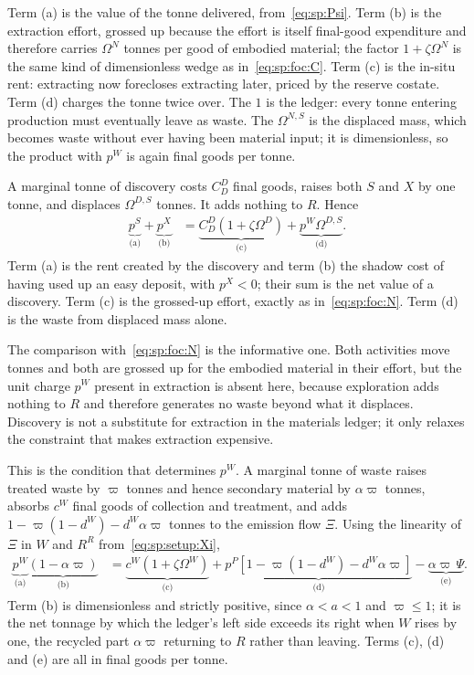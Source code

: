Term (a) is the value of the tonne delivered, from~\eqref{eq:sp:Psi}. Term (b) is the extraction effort, grossed up because the effort is itself final-good expenditure and therefore carries $\Omega^N$ tonnes per good of embodied material; the factor $1+\zeta\Omega^N$ is the same kind of dimensionless wedge as in~\eqref{eq:sp:foc:C}. Term (c) is the in-situ rent: extracting now forecloses extracting later, priced by the reserve costate. Term (d) charges the tonne twice over. The $1$ is the ledger: every tonne entering production must eventually leave as waste. The $\Omega^{N,S}$ is the displaced mass, which becomes waste without ever having been material input; it is dimensionless, so the product with $p^W$ is again final goods per tonne.

 A marginal tonne of discovery costs $C^D_D$ final goods, raises both $S$ and $X$ by one tonne, and displaces $\Omega^{D,S}$ tonnes. It adds nothing to $R$. Hence
\begin{align}
\underbrace{p^S}_{\text{(a)}}+\underbrace{p^X}_{\text{(b)}} &= \underbrace{C^D_D\left(1+\zeta\Omega^D\right)}_{\text{(c)}}+\underbrace{p^W\Omega^{D,S}}_{\text{(d)}} .
\label{eq:sp:foc:D}
\end{align}
Term (a) is the rent created by the discovery and term (b) the shadow cost of having used up an easy deposit, with $p^X<0$; their sum is the net value of a discovery. Term (c) is the grossed-up effort, exactly as in~\eqref{eq:sp:foc:N}. Term (d) is the waste from displaced mass alone.

The comparison with~\eqref{eq:sp:foc:N} is the informative one. Both activities move tonnes and both are grossed up for the embodied material in their effort, but the unit charge $p^W$ present in extraction is absent here, because exploration adds nothing to $R$ and therefore generates no waste beyond what it displaces. Discovery is not a substitute for extraction in the materials ledger; it only relaxes the constraint that makes extraction expensive.

 This is the condition that determines $p^W$. A marginal tonne of waste raises treated waste by $\varpi$ tonnes and hence secondary material by $\alpha\varpi$ tonnes, absorbs $c^W$ final goods of collection and treatment, and adds $1-\varpi\left(1-d^W\right)-d^W\alpha\varpi$ tonnes to the emission flow $\Xi$. Using the linearity of $\Xi$ in $W$ and $R^R$ from~\eqref{eq:sp:setup:Xi},
\begin{align}
\underbrace{p^W}_{\text{(a)}}\underbrace{\left(1-\alpha\varpi\right)}_{\text{(b)}} &=
\underbrace{c^W\left(1+\zeta\Omega^W\right)}_{\text{(c)}}
+\underbrace{p^P\left[1-\varpi\left(1-d^W\right)-d^W\alpha\varpi\right]}_{\text{(d)}}
-\underbrace{\alpha\varpi\,\Psi}_{\text{(e)}} .
\label{eq:sp:foc:W}
\end{align}
Term (b) is dimensionless and strictly positive, since $\alpha<a<1$ and $\varpi\le1$; it is the net tonnage by which the ledger's left side exceeds its right when $W$ rises by one, the recycled part $\alpha\varpi$ returning to $R$ rather than leaving. Terms (c), (d) and (e) are all in final goods per tonne.


